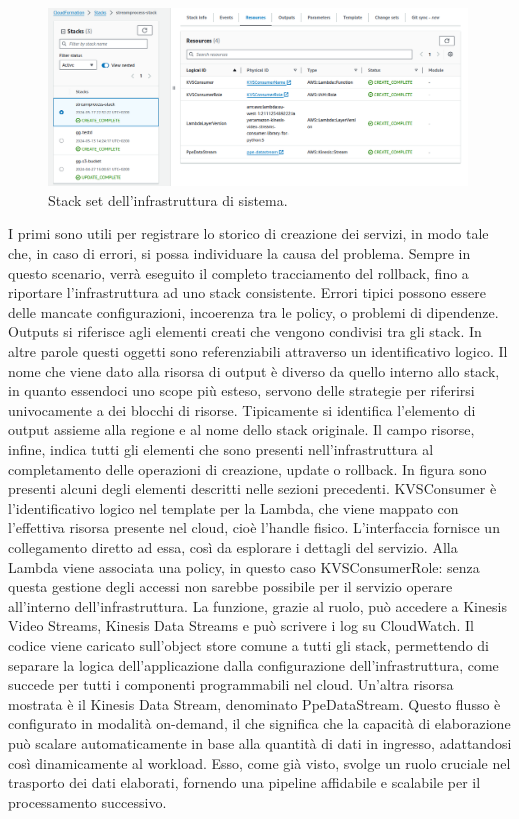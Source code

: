 \vspace{0.5cm}
\begin{figure}[htbp]
    \centering
    \includegraphics[width=0.99\textwidth]{figures/stack-set.png}
    \caption{Stack set dell'infrastruttura di sistema.} 
    \label{fig:stack-set}
\end{figure}

I primi sono utili per registrare lo storico di creazione dei servizi, in modo tale che, in caso di errori, si possa individuare la causa del problema. Sempre in questo scenario, verrà eseguito il completo tracciamento del rollback, fino a riportare l'infrastruttura ad uno stack consistente. Errori tipici possono essere delle mancate configurazioni, incoerenza tra le policy, o problemi di dipendenze. Outputs si riferisce agli elementi creati che vengono condivisi tra gli stack. In altre parole questi oggetti sono referenziabili attraverso un identificativo logico. Il nome che viene dato alla risorsa di output è diverso da quello interno allo stack, in quanto essendoci uno scope più esteso, servono delle strategie per riferirsi univocamente a dei blocchi di risorse. Tipicamente si identifica l'elemento di output assieme alla regione e al nome dello stack originale. Il campo risorse, infine, indica tutti gli elementi che sono presenti nell'infrastruttura al completamento delle operazioni di creazione, update o rollback. In figura sono presenti alcuni degli elementi descritti nelle sezioni precedenti. KVSConsumer è l'identificativo logico nel template per la Lambda, che viene mappato con l'effettiva risorsa presente nel cloud, cioè l'handle fisico. L'interfaccia fornisce un collegamento diretto ad essa, così da esplorare i dettagli del servizio. Alla Lambda viene associata una policy, in questo caso KVSConsumerRole: senza questa gestione degli accessi non sarebbe possibile per il servizio operare all'interno dell'infrastruttura. La funzione, grazie al ruolo, può accedere a Kinesis Video Streams, Kinesis Data Streams e può scrivere i log su CloudWatch. Il codice viene caricato sull'object store comune a tutti gli stack, permettendo di separare la logica dell'applicazione dalla configurazione dell'infrastruttura, come succede per tutti i componenti programmabili nel cloud. Un'altra risorsa mostrata è il Kinesis Data Stream, denominato PpeDataStream. Questo flusso è configurato in modalità on-demand, il che significa che la capacità di elaborazione può scalare automaticamente in base alla quantità di dati in ingresso, adattandosi così dinamicamente al workload. Esso, come già visto, svolge un ruolo cruciale nel trasporto dei dati elaborati, fornendo una pipeline affidabile e scalabile per il processamento successivo. 
 
